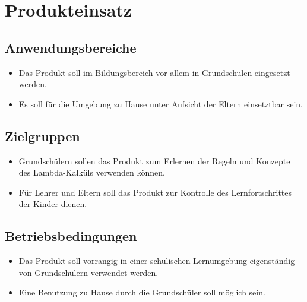 \chapter{Produkteinsatz}

\section{Anwendungsbereiche}
\begin{itemize}
	\item Das Produkt soll im Bildungsbereich vor allem in Grundschulen eingesetzt werden.
	\item Es soll für die Umgebung zu Hause unter Aufsicht der Eltern einsetztbar sein.
\end{itemize}


\section{Zielgruppen}

\begin{itemize}
	\item Grundschülern sollen das Produkt zum Erlernen der Regeln und Konzepte des Lambda-Kalküls verwenden können.
	\item Für Lehrer und Eltern soll das Produkt zur Kontrolle des Lernfortschrittes der Kinder dienen.
\end{itemize}

\section{Betriebsbedingungen}
\begin{itemize}
	\item Das Produkt soll vorrangig  in einer schulischen Lernumgebung eigenständig von Grundschülern verwendet werden.
	\item Eine Benutzung zu Hause durch die Grundschüler soll möglich sein.
\end{itemize}
